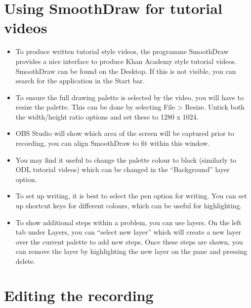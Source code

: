 \documentclass[
]{book}
\begin{document}
\hypertarget{using-smoothdraw-for-tutorial-videos}{%
\section{Using SmoothDraw for tutorial videos}\label{using-smoothdraw-for-tutorial-videos}}

\begin{itemize}
\item
  To produce written tutorial style videos, the programme SmoothDraw provides a nice interface to produce Khan Academy style tutorial videos. SmoothDraw can be found on the Desktop. If this is not visible, you can search for the application in the Start bar.
\item
  To ensure the full drawing palette is selected by the video, you will have to resize the palette. This can be done by selecting File \textgreater{} Resize. Untick both the width/height ratio options and set these to 1280 x 1024.
\item
  OBS Studio will show which area of the screen will be captured prior to recording, you can align SmoothDraw to fit within this window.
\item
  You may find it useful to change the palette colour to black (similarly to ODL tutorial videos) which can be changed in the ``Background'' layer option.
\item
  To set up writing, it is best to select the pen option for writing. You can set up shortcut keys for different colours, which can be useful for highlighting.
\item
  To show additional steps within a problem, you can use layers. On the left tab under Layers, you can ``select new layer'' which will create a new layer over the current palette to add new steps. Once these steps are shown, you can remove the layer by highlighting the new layer on the pane and pressing delete.
\end{itemize}

\hypertarget{editing-the-recording}{%
\section{Editing the recording}\label{editing-the-recording}}
\end{document}
